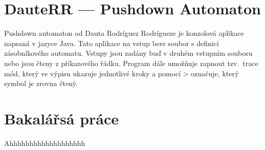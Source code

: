 \section{DauteRR --- Pushdown Automaton}

Pushdown automaton od Dauta Rodríguez Rodrígueze je konzolová aplikace napsaná v jazyce Java. Tato aplikace na vstup bere soubor s definicí zásobníkového automatu. Vstupy jsou zadány buď v druhém vstupním souboru nebo jsou čteny z příkazového řádku. Program dále umožňuje zapnout tzv.~trace mód, který ve výpisu ukazuje jednotlivé kroky a pomocí > označuje, který symbol je zrovna čtený.

\section{Bakalářsá práce}

Ahhhhhhhhhhhhhhhhhhh

\endinput